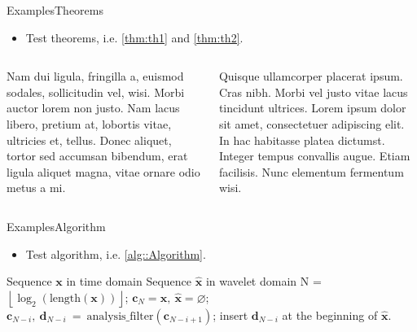 \documentclass[10pt,xcolor={dvipsnames},aspectratio=169]{beamer}
\begin{document}
\begin{frame}{Examples}{Theorems}
\begin{itemize}
  \item Test theorems, i.e. \cref{thm:th1} and \cref{thm:th2}.
\end{itemize}

\begin{columns}
  \begin{column}{.48\textwidth}
    \begin{theorem}
      Nam dui ligula, fringilla a, euismod
      sodales, sollicitudin vel, wisi. Morbi
      auctor lorem non justo. Nam lacus
      libero, pretium at, lobortis vitae,
      ultricies et, tellus. Donec aliquet,
      tortor sed accumsan bibendum, erat
      ligula aliquet magna, vitae ornare
      odio metus a mi. \label{thm:th1}
    \end{theorem}
  \end{column}
  \begin{column}{.48\textwidth}
    \begin{theorem}
      Quisque ullamcorper placerat ipsum.
      Cras nibh. Morbi vel justo vitae lacus
      tincidunt ultrices. Lorem ipsum dolor
      sit amet, consectetuer adipiscing elit.
      In hac habitasse platea dictumst.
      Integer tempus convallis augue.
      Etiam facilisis. Nunc elementum
      fermentum wisi. \label{thm:th2}
    \end{theorem}
  \end{column}
\end{columns}
\end{frame}


\begin{frame}{Examples}{Algorithm}
\begin{itemize}
  \item Test algorithm, i.e. \cref{alg::Algorithm}.
\end{itemize}

\begin{algorithm}[H]
  \caption{DWT Algorithm}
  \label{alg::Algorithm}
  \begin{algorithmic}[1]
    \REQUIRE Sequence $\mathbf{x}$ in time domain
    \ENSURE Sequence $\hat{\mathbf{x}}$ in wavelet domain
    \STATE N = $\left\lfloor \log_2 (\mathrm{length}(\mathbf{x})) \right\rfloor$;
    \STATE $\mathbf{c}_{N} = \mathbf{x},~ \hat{\mathbf{x}} = \varnothing$;
    \STATE $\mathbf{c}_{N-i},~\mathbf{d}_{N-i}~=~\mathrm{analysis\_filter}(\mathbf{c}_{N-i+1})$;
    \STATE insert $\mathbf{d}_{N-i}$ at the beginning of $\hat{\mathbf{x}}$.
    \ENDFOR
  \end{algorithmic}
\end{algorithm}
\end{frame}


\end{document}
